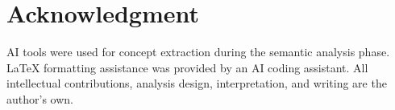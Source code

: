 \documentclass[journal]{IEEEtran}
\begin{document}
\section*{Acknowledgment}

AI tools were used for concept extraction during the semantic analysis
phase.  \LaTeX{} formatting assistance was provided by an AI coding
assistant.  All intellectual contributions, analysis design,
interpretation, and writing are the author's own.



\end{document}
